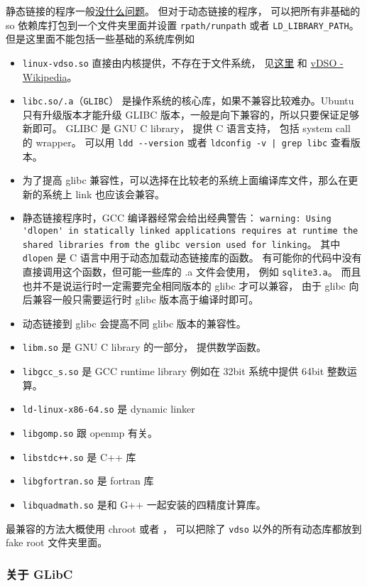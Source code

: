 静态链接的程序一般\href{https://stackoverflow.com/questions/31801824/is-static-linking-in-linux-portable}{没什么问题}。 但对于动态链接的程序， 可以把所有非基础的 so 依赖库打包到一个文件夹里面并设置 \verb`rpath/runpath` 或者 \verb`LD_LIBRARY_PATH`。 但是这里面不能包括一些基础的系统库例如
\begin{itemize}
\item \verb`linux-vdso.so` 直接由内核提供，不存在于文件系统， 见\href{https://unix.stackexchange.com/questions/476971/ldd-shows-no-location-after-arrow-library-does-not-exist-on-system}{这里} 和 \href{https://en.wikipedia.org/wiki/VDSO}{vDSO - Wikipedia}。
\item \verb`libc.so/.a`（\verb`GLIBC`） 是操作系统的核心库，如果不兼容比较难办。Ubuntu 只有升级版本才能升级 GLIBC 版本，一般是向下兼容的，所以只要保证足够新即可。 GLIBC 是 GNU C library， 提供 C 语言支持， 包括 system call 的 wrapper。 可以用 \verb`ldd --version` 或者 \verb`ldconfig -v | grep libc` 查看版本。
\item 为了提高 glibc 兼容性，可以选择在比较老的系统上面编译库文件，那么在更新的系统上 link 也应该会兼容。
\item 静态链接程序时，GCC 编译器经常会给出经典警告： \verb`warning: Using 'dlopen' in statically linked applications requires at runtime the shared libraries from the glibc version used for linking`。 其中 \verb`dlopen` 是 C 语言中用于动态加载动态链接库的函数。 有可能你的代码中没有直接调用这个函数，但可能一些库的 .a 文件会使用， 例如 \verb`sqlite3.a`。 而且也并不是说运行时一定需要完全相同版本的 glibc 才可以兼容， 由于 glibc 向后兼容一般只需要运行时 glibc 版本高于编译时即可。
\item 动态链接到 glibc 会提高不同 glibc 版本的兼容性。
\item \verb`libm.so` 是 GNU C library 的一部分， 提供数学函数。
\item \verb`libgcc_s.so` 是 GCC runtime library 例如在 32bit 系统中提供 64bit 整数运算。
\item \verb`ld-linux-x86-64.so` 是 dynamic linker
\item \verb`libgomp.so` 跟 openmp 有关。
\item \verb`libstdc++.so` 是 C++ 库
\item \verb`libgfortran.so` 是 fortran 库
\item \verb`libquadmath.so` 是和 G++ 一起安装的四精度计算库。
\end{itemize}

最兼容的方法大概使用 chroot 或者 ， 可以把除了 \verb`vdso` 以外的所有动态库都放到 fake root 文件夹里面。

\subsubsection{关于 GLibC}
